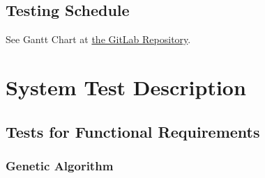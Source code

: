 \documentclass[12pt, titlepage]{article}
\begin{document}
\subsection{Testing Schedule}
See Gantt Chart at
\href{https://gitlab.cas.mcmaster.ca/linkk4/GrateBox/tree/master/ProjectSchedule}{the 
GitLab Repository}.

\section{System Test Description}
	
\subsection{Tests for Functional Requirements}

\subsubsection{Genetic Algorithm}
\end{document}
